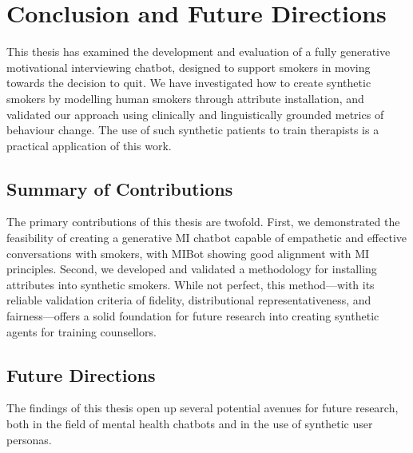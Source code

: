 \chapter{Conclusion and Future Directions}
\label{ch:conclusion}

This thesis has examined the development and evaluation of a fully generative motivational interviewing chatbot, designed to support smokers in moving towards the decision to quit. We have investigated how to create synthetic smokers by modelling human smokers through attribute installation, and validated our approach using clinically and linguistically grounded metrics of behaviour change. The use of such synthetic patients to train therapists is a practical application of this work.


\section{Summary of Contributions}

The primary contributions of this thesis are twofold. First, we demonstrated the feasibility of creating a generative MI chatbot capable of empathetic and effective conversations with smokers, with MIBot showing good alignment with MI principles. Second, we developed and validated a methodology for installing attributes into synthetic smokers. While not perfect, this method—with its reliable validation criteria of fidelity, distributional representativeness, and fairness—offers a solid foundation for future research into creating synthetic agents for training counsellors.


\section{Future Directions}
The findings of this thesis open up several potential avenues for future research, both in the field of mental health chatbots and in the use of synthetic user personas.

